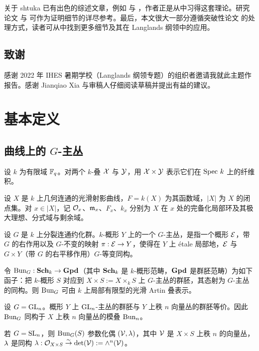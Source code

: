 关于 shtuka 已有出色的综述文章，例如 \cite{Laumon} 与 \cite{NDT-Sht}，作者正是从中习得这套理论。研究论文 \cite{Var} 与 \cite{ARH} 可作为证明细节的详尽参考。最后，本文很大一部分遵循突破性论文 \cite{VLaff} 的处理方式，读者可从中找到更多细节及其在 Langlands 纲领中的应用。


\subsection*{致谢}

感谢 2022 年 IHES 暑期学校（Langlands 纲领专题）的组织者邀请我就此主题作报告。感谢 Jianqiao Xia 与审稿人仔细阅读草稿并提出有益的建议。



\section{基本定义}\label{s:def}

\subsection{曲线上的 $G$-主丛}
设 $k$ 为有限域 $\mathbb{F}_{q}$。对两个 $k$-叠 $\mathcal{X}$ 与 $\mathcal{Y}$，用 $\mathcal{X}\times\mathcal{Y}$ 表示它们在 $\textup{Spec}\  k$ 上的纤维积。

设 $X$ 是 $k$ 上几何连通的光滑射影曲线，$F=k(X)$ 为其函数域，$|X|$ 为 $X$ 的闭点集。对 $x\in |X|$，记 $\mathcal{O}_{x}$、$\mathfrak{m}_{x}$、$F_{x}$、$k_{x}$ 分别为 $X$ 在 $x$ 处的完备化局部环及其极大理想、分式域与剩余域。

设 $G$ 是 $k$ 上分裂连通约化群。$k$-概形 $Y$ 上的一个 $G$-主丛，是指一个概形 $\mathcal{E}$，带 $G$ 的右作用以及 $G$-不变的映射 $\pi: \mathcal{E}\to Y$，使得在 $Y$ 上 étale 局部地，$\mathcal{E}$ 与 $G\times Y$（带 $G$ 的右平移作用）$G$-等变同构。

令 $\textup{Bun}_{G}: \mathbf{Sch}_{k}\to \mathbf{Gpd}$（其中 $\mathbf{Sch}_{k}$ 是 $k$-概形范畴，$\mathbf{Gpd}$ 是群胚范畴）为如下函子：把 $k$-概形 $S$ 对应到 $X\times S:=X\times_{k}S$ 上 $G$-主丛的群胚，其态射为 $G$-主丛的同构。则 $\textup{Bun}_{G}$ 可由 $k$ 上局部有限型的光滑 Artin 叠表示。

\begin{exam} 设 $G=\textup{GL}_{n}$。概形 $Y$ 上 $\textup{GL}_{n}$-主丛的群胚与 $Y$ 上秩 $n$ 向量丛的群胚等价。因此 $\textup{Bun}_{G}$ 同构于 $X$ 上秩 $n$ 向量丛的模叠 $\textup{Bun}_{n}$。

若 $G=\textup{SL}_{n}$，则 $\textup{Bun}_{G}(S)$ 参数化偶 $(\mathcal{V}, \lambda)$，其中 $\mathcal{V}$ 是 $X\times S$ 上秩 $n$ 的向量丛，$\lambda$ 是同构 $\lambda: \mathcal{O}_{X\times S}\stackrel{\sim}{\to} \det(\mathcal{V}):=\wedge^{n}(\mathcal{V})$。
\end{exam}



